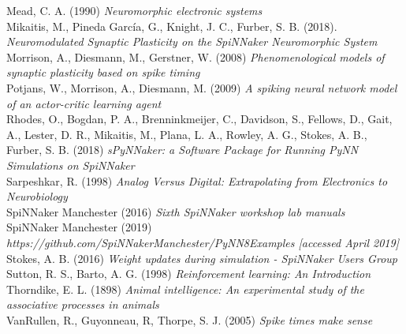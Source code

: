 \documentclass[10pt]{article}
\begin{document}
    \noindent
    Mead, C. A. (1990) \textit{Neuromorphic electronic systems} \\[-3pt]

    \noindent
    Mikaitis, M., Pineda García, G., Knight, J. C., Furber, S. B. (2018).  \textit{Neuromodulated Synaptic Plasticity on the SpiNNaker Neuromorphic System} \\[-3pt]

    \noindent
    Morrison, A., Diesmann, M., Gerstner, W. (2008) \textit{Phenomenological models of synaptic plasticity based on spike timing} \\[-3pt]

    \noindent
    Potjans, W., Morrison, A., Diesmann, M. (2009) \textit{A spiking neural network model of an actor-critic learning agent} \\[-3pt]

    \noindent
    Rhodes, O., Bogdan, P. A., Brenninkmeijer, C., Davidson, S., Fellows, D., Gait, A., Lester, D. R., Mikaitis, M., Plana, L. A., Rowley, A. G., Stokes, A. B., Furber, S. B. (2018) \textit{sPyNNaker: a Software Package for Running PyNN
    Simulations on SpiNNaker} \\[-3pt]

    \noindent
    Sarpeshkar, R. (1998) \textit{Analog Versus Digital: Extrapolating from Electronics to Neurobiology} \\[-3pt]

    \noindent
    SpiNNaker Manchester (2016) \textit{Sixth SpiNNaker workshop lab manuals} \\[-3pt]
    
    \noindent
    SpiNNaker Manchester (2019) \textit{https://github.com/SpiNNakerManchester/PyNN8Examples [accessed April 2019]} \\[-3pt]

    \noindent
    Stokes, A. B. (2016) \textit{Weight updates during simulation - SpiNNaker Users Group} \\[-3pt]

    \noindent
    Sutton, R. S., Barto, A. G. (1998) \textit{Reinforcement learning: An Introduction} \\[-3pt]

    \noindent
    Thorndike, E. L. (1898) \textit{Animal intelligence: An experimental study of the associative processes in animals} \\[-3pt]

    \noindent
    VanRullen, R., Guyonneau, R, Thorpe, S. J. (2005) \textit{Spike times make sense} \\[-3pt]
    
    
\end{document}
